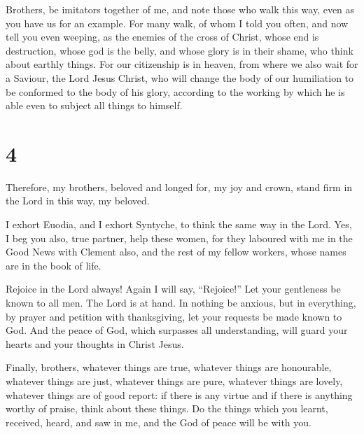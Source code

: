  Brothers, be imitators together of me, and note those
who walk this way, even as you have us for an example. 
For many walk, of whom I told you often, and now tell you even weeping,
as the enemies of the cross of Christ,  whose end is
destruction, whose god is the belly, and whose glory is in their shame,
who think about earthly things.  For our citizenship is
in heaven, from where we also wait for a Saviour, the Lord Jesus Christ,
 who will change the body of our humiliation to be
conformed to the body of his glory, according to the working by which he
is able even to subject all things to himself.

\hypertarget{section-3}{%
\section{4}\label{section-3}}

 Therefore, my brothers, beloved and longed for, my joy
and crown, stand firm in the Lord in this way, my beloved.

 I exhort Euodia, and I exhort Syntyche, to think the same
way in the Lord.  Yes, I beg you also, true partner, help
these women, for they laboured with me in the Good News with Clement
also, and the rest of my fellow workers, whose names are in the book of
life.

 Rejoice in the Lord always! Again I will say,
``Rejoice!''  Let your gentleness be known to all men. The
Lord is at hand.  In nothing be anxious, but in
everything, by prayer and petition with thanksgiving, let your requests
be made known to God.  And the peace of God, which
surpasses all understanding, will guard your hearts and your thoughts in
Christ Jesus.

 Finally, brothers, whatever things are true, whatever
things are honourable, whatever things are just, whatever things are
pure, whatever things are lovely, whatever things are of good report: if
there is any virtue and if there is anything worthy of praise, think
about these things.  Do the things which you learnt,
received, heard, and saw in me, and the God of peace will be with you.

